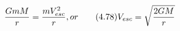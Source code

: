\begin{equation*}
\frac{GmM}{r} = \frac{mV_{esc}^{2}}{r}, or \tag{4.78}
\newline
V_{esc} = \sqrt{\frac{2GM}{r}}
\end{equation*}
